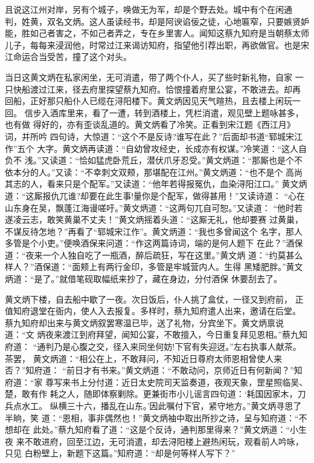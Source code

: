 且说这江州对岸，另有个城子，唤做无为军，却是个野去处。城中有个在闲通
判，姓黄，双名文炳。这人虽读经书，却是阿谀谄佞之徒，心地匾窄，只要嫉贤妒
能，胜如己者害之，不如己者弄之，专在乡里害人。闻知这蔡九知府是当朝蔡太师
儿子，每每来浸润他，时常过江来谒访知府，指望他引荐出职，再欲做官。也是宋
江命运合当受苦，撞了这个对头。

当日这黄文炳在私家闲坐，无可消遣，带了两个仆人，买了些时新礼物，自家
一只快船渡过江来，径去府里探望蔡九知府。恰恨撞着府里公宴，不敢进去。却再
回船，正好那只船仆人已缆在浔阳楼下。黄文炳因见天气暄热，且去楼上闲玩一回。
信步入酒库里来，看了一遭，转到酒楼上，凭栏消遣，观见壁上题咏甚多，也有做
得好的，亦有歪谈乱道的。黄文炳看了冷笑。正看到宋江题《西江月》词，并所吟
四句诗，大惊道：“这个不是反诗?谁写在此？”后面却书道“郓城宋江作”五个
大字。黄文炳再读道：“自幼曾攻经史，长成亦有权谋。”冷笑道：“这人自负不
浅。”又读道：“恰如猛虎卧荒丘，潜伏爪牙忍受。”黄文炳道：“那厮也是个不
依本分的人。”又读：“不幸刺文双颊，那堪配在江州。”黄文炳道：“也不是个
高尚其志的人，看来只是个配军。”又读道：“他年若得报冤仇，血染浔阳江口。”
黄文炳道：“这厮报仇兀谁?却要在此生事!量你是个配军，做得甚用！”又读诗道：
“心在山东身在吴，飘蓬江海谩嗟吁。”黄文炳道：“这两句兀自可恕。”又读道：
“他时若遂凌云志，敢笑黄巢不丈夫！”黄文炳摇着头道：“这厮无礼，他却要赛
过黄巢，不谋反待怎地？”再看了“郓城宋江作”。黄文炳道：“我也多曾闻这个
名字，那人多管是个小吏。”便唤酒保来问道：“作这两篇诗词，端的是何人题下
在此？”酒保道：“夜来一个人独自吃了一瓶酒，醉后疏狂，写在这里。”黄文炳
道：“约莫甚么样人？”酒保道：“面颊上有两行金印，多管是牢城营内人。生得
黑矮肥胖。”黄文炳道：“是了。”就借笔砚取幅纸来抄了，藏在身边，分付酒保
休要刮去了。

黄文炳下楼，自去船中歇了一夜。次日饭后，仆人挑了盒仗，一径又到府前，
正值知府退堂在衙内，使人入去报复。多样时，蔡九知府遣人出来，邀请在后堂。
蔡九知府却出来与黄文炳叙罢寒温已毕，送了礼物，分宾坐下。黄文炳禀说道：“文
炳夜来渡江到府拜望，闻知公宴，不敢擅入，今日重复拜见恩相。”蔡九知府道：
“通判乃是心腹之交，径入来同坐何妨!下官有失迎迓。”左右执事人献茶。茶罢，
黄文炳道：“相公在上，不敢拜问，不知近日尊府太师恩相曾使人来否？”知府道：
“前日才有书来。”黄文炳道：“不敢动问，京师近日有何新闻？”知府道：“家
尊写来书上分付道：近日太史院司天监奏道，夜观天象，罡星照临吴、楚，敢有作
耗之人，随即体察剿除。更兼街市小儿谣言四句道：‘耗国因家木，刀兵点水工。
纵横三十六，播乱在山东。’因此嘱付下官，紧守地方。”黄文炳寻思了半晌，笑
道：“恩相，事非偶然也！”黄文炳袖中取出所抄之诗，呈与知府道：“不想却在
此处。”蔡九知府看了道：“这是个反诗，通判那里得来？”黄文炳道：“小生夜
来不敢进府，回至江边，无可消遣，却去浔阳楼上避热闲玩，观看前人吟咏，只见
白粉壁上，新题下这篇。”知府道：“却是何等样人写下？”

